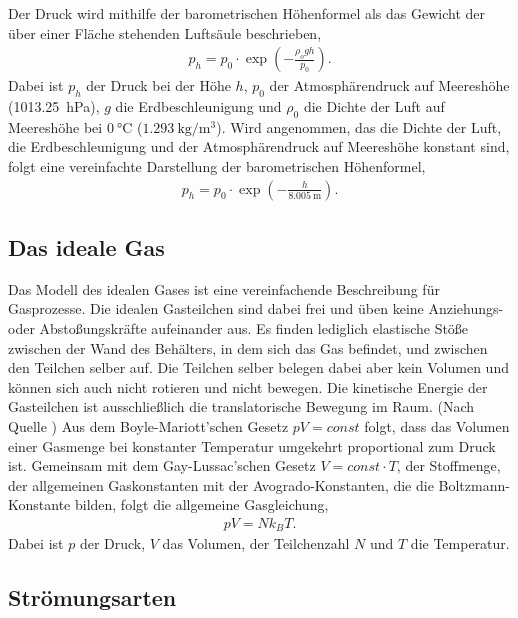 \noindent
Der Druck wird mithilfe der barometrischen Höhenformel als das Gewicht der über einer Fläche stehenden Luftsäule beschrieben,
\begin{align}
    \label{eqn:baroFormel1}
    p_h = p_0\cdot \exp\left({-\frac{\rho_o gh}{p_0}}\right).
\end{align}
Dabei ist $p_h$ der Druck bei der Höhe $h$, $p_0$ der Atmosphärendruck auf Meereshöhe (\SI{1013,25}{\hecto\pascal}), $g$ die Erdbeschleunigung und $\rho_0$ die Dichte der Luft
auf Meereshöhe bei $\SI{0}{\celsius}$  ($\SI{1,293}{\kilo\gram\per\meter\cubed}$).
Wird angenommen, das die Dichte der Luft, die Erdbeschleunigung und der Atmosphärendruck auf Meereshöhe konstant sind, folgt eine vereinfachte Darstellung der barometrischen
Höhenformel,
\begin{align}
    \label{eqn:baroFormel2}
    p_h = p_0\cdot\exp\left(-\frac{h}{\SI{8,005}{\meter}}\right).
\end{align}

\subsection{Das ideale Gas}
\label{subsec:idGas}

Das Modell des idealen Gases ist eine vereinfachende Beschreibung für Gasprozesse. Die idealen Gasteilchen sind dabei frei und üben keine Anziehungs- oder Abstoßungskräfte 
aufeinander aus. Es finden lediglich elastische Stöße zwischen der Wand des Behälters, in dem sich das Gas befindet, und zwischen den Teilchen selber auf. Die Teilchen selber
belegen dabei aber kein Volumen und können sich auch nicht rotieren und nicht bewegen. Die kinetische Energie der Gasteilchen ist ausschließlich die translatorische Bewegung
im Raum. \newline
(Nach Quelle \cite{EinfuehrungVakuum}) Aus dem Boyle-Mariott'schen Gesetz $pV=const$ folgt, dass das Volumen einer Gasmenge bei konstanter Temperatur umgekehrt proportional zum Druck
ist. Gemeinsam mit dem Gay-Lussac'schen Gesetz $V=const\cdot T$, der Stoffmenge, der allgemeinen Gaskonstanten mit der Avogrado-Konstanten, die die Boltzmann-Konstante bilden,
folgt die allgemeine Gasgleichung,
\begin{align}
    \label{eqn:allgGasgl}
    pV=Nk_BT.
\end{align}
Dabei ist $p$ der Druck, $V$ das Volumen, der Teilchenzahl $N$ und $T$ die Temperatur.

\subsection{Strömungsarten}
\label{subsec:stroemungsarten}


